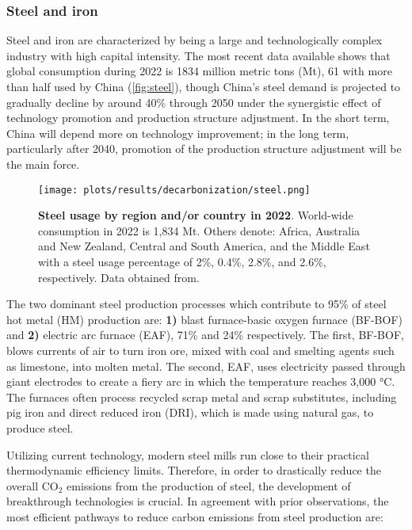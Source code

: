 \subsubsection{Steel and iron}
\label{sec:steel_and_iron}

Steel and iron are characterized by being a large and technologically complex industry with high capital intensity. The most recent data available shows that global consumption during 2022 is 1834 million metric tons (Mt), 61 with more than half used by China (\autoref{fig:steel}), though China’s steel demand is projected to gradually decline by around 40\% through 2050\autocite{rissman2020technologies} under the synergistic effect of technology promotion and production structure adjustment. In the short term, China will depend more on technology improvement; in the long term, particularly after 2040, promotion of the production structure adjustment will be the main force.\autocite{zhang2018comprehensive}

\begin{figure}[ht!]
  \centering
  \texttt{[image: plots/results/decarbonization/steel.png]}
  \caption[Steel usage by region and/or country in 2022]{\textbf{Steel usage by region and/or country in 2022}. World-wide consumption in 2022 is 1,834 Mt. Others denote: Africa, Australia and New Zealand, Central and South America, and the Middle East with a steel usage percentage of 2\%, 0.4\%, 2.8\%, and 2.6\%, respectively. Data obtained from.\autocite{worldsteel2022world}}
  \label{fig:steel}
\end{figure}


The two dominant steel production processes which contribute to 95\% of steel hot metal (HM) production are: \textbf{1)} blast furnace-basic oxygen furnace (BF-BOF) and \textbf{2)} electric arc furnace (EAF), 71\% and 24\% respectively.\autocite{fan2021low} The first, BF-BOF, blows currents of air to turn iron ore, mixed with coal and smelting agents such as limestone, into molten metal. The second, EAF, uses electricity passed through giant electrodes to create a fiery arc in which the temperature reaches 3,000 °C. The furnaces often process recycled scrap metal and scrap substitutes, including pig iron and direct reduced iron (DRI), which is made using natural gas, to produce steel.\autocite{mckinsey_2020}

Utilizing current technology, modern steel mills run close to their practical thermodynamic efficiency limits. Therefore, in order to drastically reduce the overall CO$_2$ emissions from the production of steel, the development of breakthrough technologies is crucial.\autocite{rissman2020technologies} In agreement with prior observations,\autocite{aus_2022} the most efficient pathways to reduce carbon emissions from steel production are: 

